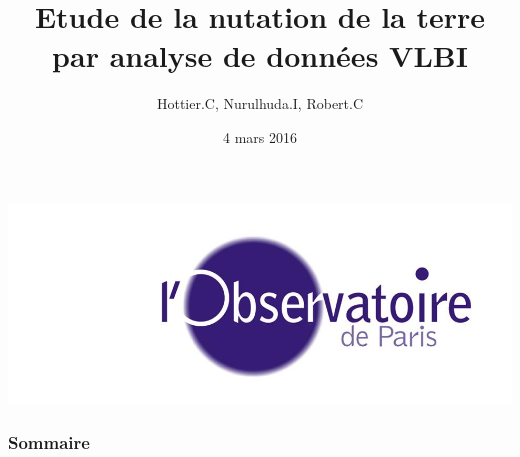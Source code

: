 \documentclass[french]{beamer}
\title[Soutenance MT3]{Etude de la nutation de la terre par analyse de données VLBI}
\author{
Hottier.C, Nurulhuda.I, Robert.C}
\date{4 mars 2016}
\begin{document}
\begin{frame}
  \maketitle
  \begin{center}
    \includegraphics[height=0.20\textheight]{Figures/siteon0.jpg}
  \end{center}
\end{frame}

\begin{frame}
  \frametitle{Sommaire}
  \tableofcontents
\end{frame}
















\end{document}
